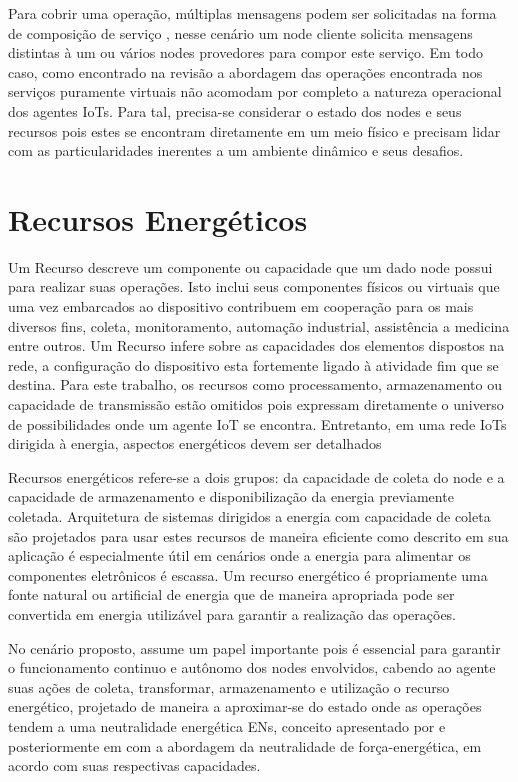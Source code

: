 Para cobrir uma operação, múltiplas mensagens podem ser solicitadas na forma de composição de serviço \cite{service_composition}, nesse cenário um node cliente solicita mensagens distintas à um ou vários nodes provedores para compor este serviço. Em todo caso, como encontrado na revisão \cite{kahloul_service_2019} a abordagem das operações encontrada nos serviços puramente virtuais não acomodam por completo a natureza operacional dos agentes \acp{IoT}. Para tal, precisa-se considerar o estado dos nodes e seus recursos pois estes se encontram diretamente em um meio físico e precisam lidar com as particularidades inerentes a um ambiente dinâmico e seus desafios.

\section{Recursos Energéticos}

Um Recurso descreve um componente ou capacidade que um dado node possui para realizar suas operações. Isto inclui seus componentes físicos ou virtuais que uma vez embarcados ao dispositivo contribuem em cooperação para os mais diversos fins, coleta, monitoramento, automação industrial, assistência a medicina entre outros. Um Recurso infere sobre as capacidades dos elementos dispostos na rede, a configuração do dispositivo esta fortemente ligado à atividade fim que se destina. Para este trabalho, os recursos como processamento, armazenamento ou capacidade de transmissão estão omitidos pois expressam diretamente o universo de possibilidades onde um agente \acs{IoT} se encontra. Entretanto, em uma rede \acp{IoT} dirigida à energia, aspectos energéticos devem ser detalhados

Recursos energéticos refere-se a dois grupos: da capacidade de coleta do node e a capacidade de armazenamento e disponibilização da energia previamente coletada. Arquitetura de sistemas dirigidos a energia com capacidade de coleta são projetados para usar estes recursos de maneira eficiente como descrito em \cite{prauzek_energy_2018} sua aplicação é especialmente útil em cenários onde a energia para alimentar os componentes eletrônicos é escassa. Um recurso energético é propriamente uma fonte natural ou artificial de energia que de maneira apropriada pode ser convertida em energia utilizável para garantir a realização das operações. 

No cenário proposto, assume um papel importante pois é essencial para garantir o funcionamento continuo e autônomo dos nodes envolvidos, cabendo ao agente suas ações de coleta, transformar, armazenamento e utilização o recurso energético, projetado de maneira a aproximar-se do estado onde as operações tendem a uma neutralidade energética \acfp{EN}, conceito apresentado por \cite{kansal_power_2007} e posteriormente em \cite{merrett_energy-driven_2017} com a abordagem da neutralidade de força-energética, em acordo com suas respectivas capacidades.

